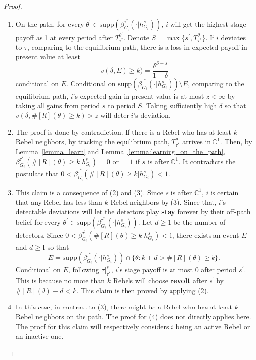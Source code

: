 \documentclass[12pt,letter]{article}
\newcommand{\Kappa}{\mathbb{C}}
\theoremstyle{definition}
\theoremstyle{remark}
\theoremstyle{claim}
\begin{document}
\begin{proof}
\begin{enumerate}[label=(\arabic*)]
\item On the path, for every $\theta^{'}\in \mathrm{supp}(\beta^{\tau^{*}}_{G_i}(\cdot |h^s_{G_i}))$, $i$ will get the highest stage payoff as 1 at every period after $T^{\theta^{'}}_{\tau^{*}}$. Denote $S=\max\{s^{'}, T^{\theta}_{\tau^{*}}\}$. If $i$ deviates to $\tau$, comparing to the equilibrium path, there is a loss in expected payoff in present value at least 
\[v(\delta, E)\geq k)=\frac{\delta^{S-s}}{1-\delta}\] 
conditional on $E$. Conditional on $\mathrm{supp}(\beta^{\tau^{*}}_{G_i}(\cdot |h^s_{G_i}))\setminus E$, comparing to the equilibrium path, $i$'s expected gain in present value is at most $z<\infty$ by taking all gains from period $s$ to period $S$. Taking sufficiently high $\delta$ so that $v(\delta, \#[R](\theta)\geq k)>z$ will deter $i$'s deviation.
\item The proof is done by contradiction. If there is a Rebel who has at least $k$ Rebel neighbors, by tracking the equilibrium path, $T^{\theta}_{\tau^{*}}$ arrives in $\Kappa^1$. Then, by Lemma~\ref{lemma_learn} and Lemma~\ref{lemma:learning_on_the_path}, $\beta^{\tau^{*}}_{G_i}(\#[R](\theta)\geq k|h^s_{G_i})=0$ or $=1$ if $s$ is after $\Kappa^1$. It contradicts the postulate that $0<\beta^{\tau^{*}}_{G_i}(\#[R](\theta)\geq k|h^s_{G_i})<1$.
\item This claim is a consequence of (2) and (3). Since $s$ is after $\Kappa^1$, $i$ is certain that any Rebel has less than $k$ Rebel neighbors by (3). Since that, $i$'s detectable deviations will let the detectors play \textbf{stay} forever by their off-path belief for every $\theta^{'}\in \mathrm{supp}(\beta^{\tau^{*}}_{G_i}(\cdot |h^s_{G_i}))$. Let $d\geq 1$ be the number of detectors. Since $0<\beta^{\tau^{*}}_{G_i}(\#[R](\theta)\geq k|h^s_{G_i})<1$, there exists an event $E$ and $d\geq 1$ so that
\[E=\mathrm{supp}(\beta^{\tau^{*}}_{G_i}(\cdot |h^s_{G_i}))\cap \{\theta:k+d>\#[R](\theta)\geq k\}.\] 
Conditional on $E$, following $\tau|^s_{\tau^{*}}$, $i$'s stage payoff is at most 0 after period $s^{'}$. This is because no more than $k$ Rebels will choose \textbf{revolt} after $s^{'}$ by $\#[R](\theta)-d<k$. This claim is then proved by applying (2).
\item In this case, in contrast to (3), there might be a Rebel who has at least $k$ Rebel neighbors on the path. The proof for (4) does not directly applies here. The proof for this claim will respectively considers $i$ being an active Rebel or an inactive one. 


\end{enumerate}
\end{proof}
\end{document}
